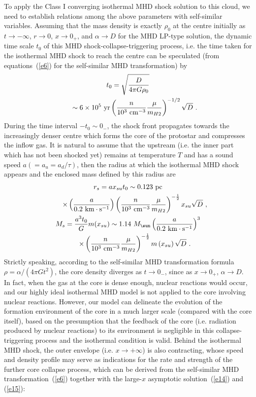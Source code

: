 \documentclass[fleqn,usenatbib]{mnras}
\begin{document}
To apply the Class I converging isothermal MHD shock solution to this cloud, we need to establish relations among the above parameters with self-similar variables. Assuming that the mass density is exactly $\rho_{0}$ at the centre initially as $t\rightarrow -\infty$, $r\rightarrow 0$, $x\rightarrow 0_{+}$, and $\alpha\rightarrow D$ for the MHD LP-type solution, the dynamic time scale $t_{0}$ of this MHD shock-collapse-triggering process, i.e. the time taken for the isothermal MHD shock to reach the centre can be speculated (from equations~(\ref{e6}) for the self-similar MHD transformation) by 
\begin{gather}
t_{0}=\sqrt{\frac{D}{4\pi G\rho_{0}}}\notag\\
\qquad\sim 6\times 10^{5}~\mathrm{yr} \left(\frac{n}{10^{3}~\mathrm{cm^{-3}}}
 \frac{\mu}{m_{H2}}\right)^{-1/2}\sqrt{D}\ .\label{e44}
\end{gather}
During the time interval $-t_{0}\sim 0_{-}$, the shock front propagates towards the increasingly denser centre which forms the core of the protostar and compresses the inflow gas. It is natural to assume that the upstream (i.e. the inner part which has not been shocked yet) remains at temperature $T$ and has a sound speed $a(=a_{u}=a_{d}/\tau)$, then the radius at which the isothermal MHD shock appears and the enclosed mass defined by this radius are
\begin{gather}
r_{s}=a x_{su}t_{0}\sim 0.123~\mathrm{pc}\notag\\
\qquad\times \left(\frac{a}{0.2~\mathrm{km\cdot s^{-1}}}\right)\left(\frac{n}{10^{3}~\mathrm{cm^{-3}}}\frac{\mu}{m_{H2}}\right)^{-\frac{1}{2}}x_{su}\sqrt{D}\ ,\label{e45}\\
M_{s}=\frac{a^{3}t_{0}}{G}m(x_{su})\sim 1.14~M_{\sun}\left(\frac{a}{0.2~\mathrm{km\cdot s^{-1}}}\right)^{3}\notag\\
\qquad\times \left(\frac{n}{10^{3}~\mathrm{cm^{-3}}}\frac{\mu}{m_{H2}}\right)^{-\frac{1}{2}}m\left(x_{su}\right)\sqrt{D}\ .\label{e46}
\end{gather}
Strictly speaking, according to the self-similar MHD transformation formula $\rho=\alpha/\left(4\pi Gt^{2}\right)$, the core density diverges as $t\rightarrow 0_{-}$, since as $x\rightarrow 0_{+}$, $\alpha\rightarrow D$. In fact, when the gas at the core is dense enough, nuclear reactions would occur, and our highly ideal isothermal MHD model is not applied to the core involving nuclear reactions. However, our model can delineate the evolution of the formation environment of the core in a much larger scale (compared with the core itself), based on the presumption that the feedback of the core (i.e. radiation produced by nuclear reactions) to its environment is negligible in this collapse-triggering process and the isothermal condition is valid. Behind the isothermal MHD shock, the outer envelope (i.e. $x\rightarrow +\infty$) is also contracting, whose speed and density profile may serve as indications for the rate and strength of the further core collapse process, which can be derived from the self-similar MHD transformation~(\ref{e6}) together with the large-$x$ asymptotic solution~(\ref{e14}) and (\ref{e15}):
\end{document}
